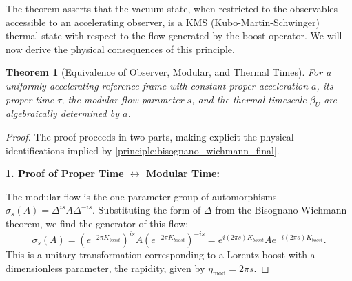 \documentclass[11pt, letterpaper]{report}
\theoremstyle{plain} %
\newtheorem{theorem}{Theorem}[chapter]
\theoremstyle{definition} %
\theoremstyle{remark} %
\begin{document}
The theorem asserts that the vacuum state, when restricted to the observables accessible to an accelerating observer, is a KMS (Kubo-Martin-Schwinger) thermal state with respect to the flow generated by the boost operator. We will now derive the physical consequences of this principle.

\begin{theorem}[Equivalence of Observer, Modular, and Thermal Times]
\label{thm:observer_modular_thermal_equivalence_final}
For a uniformly accelerating reference frame with constant proper acceleration $a$, its proper time $\tau$, the modular flow parameter $s$, and the thermal timescale $\beta_U$ are algebraically determined by $a$.
\end{theorem}
\begin{proof}
The proof proceeds in two parts, making explicit the physical identifications implied by \cref{principle:bisognano_wichmann_final}.

\textbf{1. Proof of Proper Time $\leftrightarrow$ Modular Time:}

The modular flow is the one-parameter group of automorphisms $\sigma_s(A) = \Delta^{is} A \Delta^{-is}$. Substituting the form of $\Delta$ from the Bisognano-Wichmann theorem, we find the generator of this flow:
\begin{equation}
    \sigma_s(A) = (e^{-2\pi K_{boost}})^{is} A (e^{-2\pi K_{boost}})^{-is} = e^{i(2\pi s)K_{boost}} A e^{-i(2\pi s)K_{boost}}.
\end{equation}
This is a unitary transformation corresponding to a Lorentz boost with a dimensionless parameter, the rapidity, given by $\eta_{\text{mod}} = 2\pi s$.


\end{proof}
\end{document}
